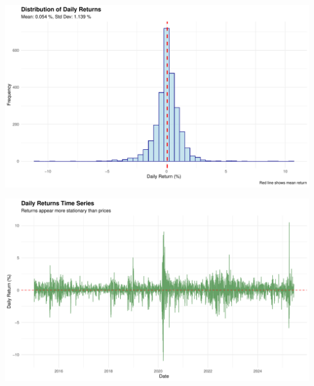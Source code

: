 \documentclass[
]{article}
\newenvironment{Shaded}{\begin{snugshade}}{\end{snugshade}}
\newcommand{\NormalTok}[1]{#1}
\newcommand{\SpecialCharTok}[1]{\textcolor[rgb]{0.81,0.36,0.00}{\textbf{#1}}}
\begin{document}
\begin{Shaded}
\end{Shaded}

\includegraphics{task1_files/figure-latex/return-analysis-plots-2.pdf}

\begin{Shaded}
\end{Shaded}

\includegraphics{task1_files/figure-latex/return-analysis-plots-3.pdf}
\end{document}
